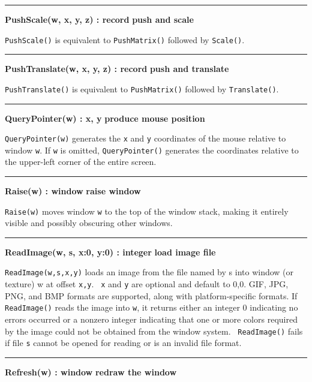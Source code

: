 \bigskip\hrule\vspace{0.1cm}
\noindent
{\bf PushScale(w, x, y, z) : record } \hfill {\bf push and scale}

\noindent
\texttt{PushScale()} is equivalent to \texttt{PushMatrix()} followed
by \texttt{Scale()}.

\bigskip\hrule\vspace{0.1cm}
\noindent
{\bf PushTranslate(w, x, y, z) : record } \hfill {\bf push and translate}

\noindent
\texttt{PushTranslate()} is equivalent to \texttt{PushMatrix()} followed
by \texttt{Translate()}.

\bigskip\hrule\vspace{0.1cm}
\noindent
{\bf QueryPointer(w) : x, y } \hfill {\bf produce mouse position}

\noindent
\texttt{QueryPointer(w)} generates the \texttt{x} and \texttt{y}
coordinates of the mouse relative to window \texttt{w}. If \texttt{w}
is omitted, \texttt{QueryPointer()} generates the coordinates relative
to the upper-left corner of the entire screen.

\bigskip\hrule\vspace{0.1cm}
\noindent
{\bf Raise(w) : window } \hfill {\bf raise window}

\noindent
\texttt{Raise(w)} moves window \texttt{w} to the top of the window
stack, making it entirely visible and possibly obscuring other windows.

\bigskip\hrule\vspace{0.1cm}
\noindent
{\bf ReadImage(w, s, x:0, y:0) : integer } \hfill {\bf load image file}

\noindent
\texttt{ReadImage(w,s,x,y)} loads an image from the file named by s into
window (or texture) w at offset \texttt{x,y}. \texttt{\ x} and \texttt{y} are
optional and default to 0,0. GIF, JPG, PNG, and BMP formats are supported,
along with platform-specific formats. If \texttt{ReadImage()} reads the
image into \texttt{w}, it returns either an integer 0 indicating no
errors occurred or a nonzero integer indicating that one or more colors
required by the image could not be obtained from the window system.
\ \texttt{ReadImage()} fails if file \texttt{s} cannot be opened for
reading or is an invalid file format.

\bigskip\hrule\vspace{0.1cm}
\noindent
{\bf Refresh(w) : window } \hfill {\bf redraw the window}

